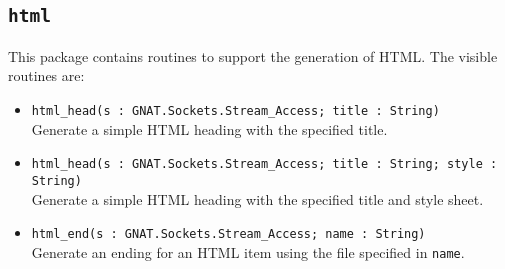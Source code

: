 \documentclass[10pt, openany]{book}
\begin{document}
\subsection{\texttt{html}}
This package contains routines to support the generation of HTML.  The visible routines are:
\begin{itemize}
  \item \verb|html_head(s : GNAT.Sockets.Stream_Access; title : String)|\\
  Generate a simple HTML heading with the specified title.
  \item \verb|html_head(s : GNAT.Sockets.Stream_Access; title : String; style : String)|\\
  Generate a simple HTML heading with the specified title and style sheet.
  \item \verb|html_end(s : GNAT.Sockets.Stream_Access; name : String)|\\
  Generate an ending for an HTML item using the file specified in \texttt{name}.
\end{itemize}
\end{document}
